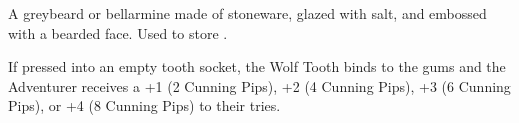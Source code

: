 \MARVELS[
  Name=Witch Bottle,
  Link=marvels-witch-bottle,
  Pips=2
]

A greybeard or bellarmine made of stoneware, glazed with salt, and embossed with a bearded face. Used to store .


\MARVELS[
  Name=Wolf Tooth,
  Link=marvels-wolf-tooth,
  Pips=2+
]

If pressed into an empty tooth socket, the Wolf Tooth binds to the gums and the Adventurer receives a +1 (2 Cunning Pips), +2 (4 Cunning Pips), +3 (6 Cunning Pips), or +4 (8 Cunning Pips) to their  tries.


